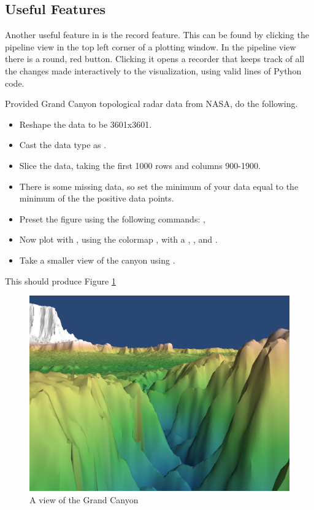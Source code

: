 \subsection*{Useful Features}
Another useful feature in  is the record feature.
This can be found by clicking the pipeline view in the top left corner of a plotting window.
In the pipeline view there is a round, red button.
Clicking it opens a recorder that keeps track of all the changes made interactively to the visualization, using valid lines of Python code.

\begin{problem}
Provided Grand Canyon topological radar data from NASA, do the following.

\begin{itemize}
\item Reshape the data to be 3601x3601.
\item Cast the data type as .
\item Slice the data, taking the first 1000 rows and columns 900-1900.
\item There is some missing data, so set the minimum of your data equal to the minimum of the the positive data points.
\item Preset the figure using the following commands: , 
\item Now plot with , using the colormap , with a , , and .
\item Take a smaller view of the canyon using .
\end{itemize}

This should produce Figure \ref{fig:GrandCanyon}

\end{problem}

\begin{figure}
\includegraphics[width=\textwidth]{GrandCanyon.png}
\caption{A view of the Grand Canyon}
\label{fig:GrandCanyon}
\end{figure}

